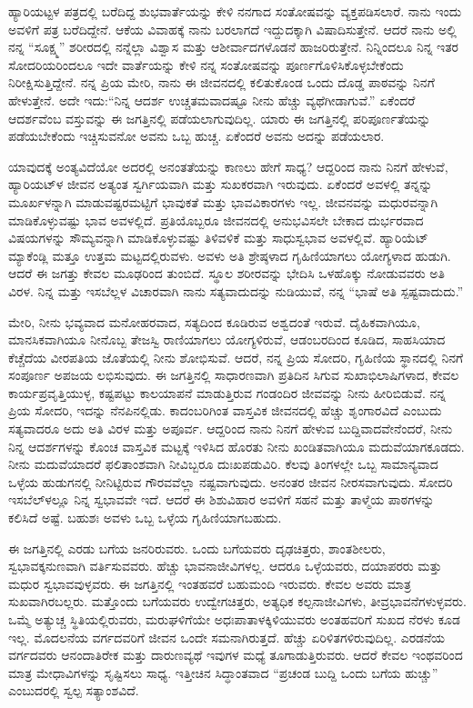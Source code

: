 ಹ್ಯಾರಿಯಟ್ಟಳ ಪತ್ರದಲ್ಲಿ ಬರೆದಿದ್ದ ಶುಭವಾರ್ತೆಯನ್ನು ಕೇಳಿ ನನಗಾದ ಸಂತೋಷವನ್ನು ವ್ಯಕ್ತಪಡಿಸಲಾರೆ. ನಾನು ಇಂದು ಅವಳಿಗೆ ಪತ್ರ ಬರೆದಿದ್ದೇನೆ. ಆಕೆಯ ವಿವಾಹಕ್ಕೆ ನಾನು ಬರಲಾಗದೆ ಇದ್ದುದಕ್ಕಾಗಿ ವಿಷಾದಿಸುತ್ತೇನೆ. ಆದರೆ ನಾನು ಅಲ್ಲಿ ನನ್ನ “ಸೂಕ್ಷ್ಮ” ಶರೀರದಲ್ಲಿ ನನ್ನೆಲ್ಲಾ ವಿಶ್ವಾಸ ಮತ್ತು ಆಶೀರ್ವಾದಗಳೊಡನೆ ಹಾಜರಿರುತ್ತೇನೆ. ನಿನ್ನಿಂದಲೂ ನಿನ್ನ ಇತರ ಸೋದರಿಯರಿಂದಲೂ ಇದೇ ವಾರ್ತೆಯನ್ನು ಕೇಳಿ ನನ್ನ ಸಂತೋಷವನ್ನು ಪೂರ್ಣಗೊಳಿಸಿಕೊಳ್ಳಬೇಕೆಂದು ನಿರೀಕ್ಷಿಸುತ್ತಿದ್ದೇನೆ. ನನ್ನ ಪ್ರಿಯ ಮೇರಿ, ನಾನು ಈ ಜೀವನದಲ್ಲಿ ಕಲಿತುಕೊಂಡ ಒಂದು ದೊಡ್ಡ ಪಾಠವನ್ನು ನಿನಗೆ ಹೇಳುತ್ತೇನೆ. ಅದೇ ಇದು:\break “ನಿನ್ನ ಆದರ್ಶ ಉಚ್ಚತಮವಾದಷ್ಟೂ ನೀನು ಹೆಚ್ಚು ವ್ಯಥೆಗೀಡಾಗುವೆ.” ಏಕೆಂದರೆ ಆದರ್ಶವೆಂಬ ವಸ್ತುವನ್ನು ಈ ಜಗತ್ತಿನಲ್ಲಿ ಪಡೆಯಲಾಗುವುದಿಲ್ಲ. ಯಾರು ಈ ಜಗತ್ತಿನಲ್ಲಿ ಪರಿಪೂರ್ಣತೆಯನ್ನು ಪಡೆಯಬೇಕೆಂದು ಇಚ್ಚಿಸುವನೋ ಅವನು ಒಬ್ಬ ಹುಚ್ಚ. ಏಕೆಂದರೆ ಅವನು ಅದನ್ನು ಪಡೆಯಲಾರ.

ಯಾವುದಕ್ಕೆ ಅಂತ್ಯವಿದೆಯೋ ಅದರಲ್ಲಿ ಅನಂತತೆಯನ್ನು ಕಾಣಲು ಹೇಗೆ ಸಾಧ್ಯ? ಆದ್ದರಿಂದ ನಾನು ನಿನಗೆ ಹೇಳುವೆ, ಹ್ಯಾರಿಯಟ್‌ಳ ಜೀವನ ಅತ್ಯಂತ ಸ್ವರ್ಗಿಯವಾಗಿ ಮತ್ತು ಸುಖಕರವಾಗಿ ಇರುವುದು. ಏಕೆಂದರೆ ಅವಳಲ್ಲಿ ತನ್ನನ್ನು ಮೂರ್ಖಳನ್ನಾಗಿ ಮಾಡುವಷ್ಟರಮಟ್ಟಿಗೆ ಭಾವುಕತೆ ಮತ್ತು ಭಾವವಿಕಾರಗಳು ಇಲ್ಲ. ಜೀವನವನ್ನು ಮಧುರವನ್ನಾಗಿ ಮಾಡಿಕೊಳ್ಳುವಷ್ಟು ಭಾವ ಅವಳಲ್ಲಿದೆ. ಪ್ರತಿಯೊಬ್ಬರೂ ಜೀವನದಲ್ಲಿ ಅನುಭವಿಸಲೇ ಬೇಕಾದ ದುರ್ಭರವಾದ ವಿಷಯಗಳನ್ನು ಸೌಮ್ಯವನ್ನಾಗಿ ಮಾಡಿಕೊಳ್ಳುವಷ್ಟು ತಿಳಿವಳಿಕೆ ಮತ್ತು ಸಾಧುಸ್ವಭಾವ ಅವಳಲ್ಲಿವೆ. ಹ್ಯಾರಿಯೆಟ್ ಮ್ಯಾಕೆಂಡ್ಲಿ ಮತ್ತೂ ಉತ್ತಮ ಮಟ್ಟದಲ್ಲಿರುವಳು. ಅವಳು ಅತಿ ಶ್ರೇಷ್ಠಳಾದ ಗೃಹಿಣಿಯಾಗಲು ಯೋಗ್ಯಳಾದ ಹುಡುಗಿ. ಆದರೆ ಈ ಜಗತ್ತು ಕೇವಲ ಮೂಢರಿಂದ ತುಂಬಿದೆ. ಸ್ಥೂಲ ಶರೀರವನ್ನು ಭೇದಿಸಿ ಒಳಹೊಕ್ಕು ನೋಡುವವರು ಅತಿ ವಿರಳ. ನಿನ್ನ ಮತ್ತು ಇಸಬೆಲ್ಲಳ ವಿಚಾರವಾಗಿ ನಾನು ಸತ್ಯವಾದುದನ್ನು ನುಡಿಯುವೆ, ನನ್ನ “ಭಾಷೆ ಅತಿ ಸ್ಪಷ್ಟವಾದುದು.”

ಮೇರಿ, ನೀನು ಭವ್ಯವಾದ ಮನೋಹರವಾದ, ಸತ್ಯದಿಂದ ಕೂಡಿರುವ ಅಶ್ವದಂತೆ ಇರುವೆ. ದೈಹಿಕವಾಗಿಯೂ, ಮಾನಸಿಕವಾಗಿಯೂ ನೀನೊಬ್ಬ ತೇಜಸ್ವಿ ರಾಣಿಯಾಗಲು ಯೋಗ್ಯಳಿರುವೆ, ಆಡಂಬರದಿಂದ ಕೂಡಿದ, ಸಾಹಸಿಯಾದ ಕೆಚ್ಚೆದೆಯ ವೀರಪತಿಯ ಜೊತೆಯಲ್ಲಿ ನೀನು ಶೋಭಿಸುವೆ. ಆದರೆ, ನನ್ನ ಪ್ರಿಯ ಸೋದರಿ, ಗೃಹಿಣಿಯ ಸ್ಥಾನದಲ್ಲಿ ನಿನಗೆ ಸಂಪೂರ್ಣ ಅಪಜಯ ಲಭಿಸುವುದು. ಈ ಜಗತ್ತಿನಲ್ಲಿ ಸಾಧಾರಣವಾಗಿ ಪ್ರತಿದಿನ ಸಿಗುವ ಸುಖಾಭಿಲಾಷಿಗಳಾದ, ಕೇವಲ ಕಾರ್ಯಪ್ರವೃತ್ತಿಯುಳ್ಳ, ಕಷ್ಟಪಟ್ಟು ಕಾಲಯಾಪನೆ ಮಾಡುತ್ತಿರುವ ಗಂಡಂದಿರ ಜೀವವನ್ನು ನೀನು ಹೀರಿಬಿಡುವೆ. ನನ್ನ ಪ್ರಿಯ ಸೋದರಿ, ಇದನ್ನು ನೆನಪಿನಲ್ಲಿಡು. ಕಾದಂಬರಿಗಿಂತ ವಾಸ್ತವಿಕ ಜೀವನದಲ್ಲಿ ಹೆಚ್ಚು ಶೃಂಗಾರವಿದೆ ಎಂಬುದು ಸತ್ಯವಾದರೂ ಅದು ಅತಿ ವಿರಳ ಮತ್ತು ಅಪೂರ್ವ. ಆದ್ದರಿಂದ ನಾನು ನಿನಗೆ ಹೇಳುವ ಬುದ್ದಿವಾದವೇನೆಂದರೆ, ನೀನು ನಿನ್ನ ಆದರ್ಶಗಳನ್ನು ಕೊಂಚ ವಾಸ್ತವಿಕ ಮಟ್ಟಕ್ಕೆ ಇಳಿಸಿದ ಹೊರತು ನೀನು ಖಂಡಿತವಾಗಿಯೂ ಮದುವೆಯಾಗಕೂಡದು. ನೀನು ಮದುವೆಯಾದರೆ ಫಲಿತಾಂಶವಾಗಿ ನೀವಿಬ್ಬರೂ ದುಃಖಪಡುವಿರಿ. ಕೆಲವು ತಿಂಗಳಲ್ಲೇ ಒಬ್ಬ ಸಾಮಾನ್ಯವಾದ ಒಳ್ಳೆಯ ಹುಡುಗನಲ್ಲಿ ನೀನಿಟ್ಟಿರುವ ಗೌರವವೆಲ್ಲಾ ನಷ್ಟವಾಗುವುದು. ಅನಂತರ ಜೀವನ ನೀರಸವಾಗುವುದು. ಸೋದರಿ ಇಸಬೆಲ್‌ಳಲ್ಲೂ ನಿನ್ನ ಸ್ವಭಾವವೇ ಇದೆ. ಆದರೆ ಈ ಶಿಶುವಿಹಾರ ಅವಳಿಗೆ ಸಹನೆ ಮತ್ತು ತಾಳ್ಮೆಯ ಪಾಠಗಳನ್ನು ಕಲಿಸಿದೆ ಅಷ್ಟೆ. ಬಹುಶಃ ಅವಳು ಒಬ್ಬ ಒಳ್ಳೆಯ ಗೃಹಿಣಿಯಾಗಬಹುದು.

ಈ ಜಗತ್ತಿನಲ್ಲಿ ಎರಡು ಬಗೆಯ ಜನರಿರುವರು. ಒಂದು ಬಗೆಯವರು ದೃಢಚಿತ್ತರು, ಶಾಂತಶೀಲರು, ಸ್ವಭಾವಕ್ಕನುಣವಾಗಿ ವರ್ತಿಸುವವರು. ಹೆಚ್ಚು ಭಾವನಾಜೀವಿಗಳಲ್ಲ. ಆದರೂ ಒಳ್ಳೆಯವರು, ದಯಾಪರರು ಮತ್ತು ಮಧುರ ಸ್ವಭಾವವುಳ್ಳವರು. ಈ ಜಗತ್ತಿನಲ್ಲಿ ಇಂತಹವರೆ ಬಹುಮಂದಿ ಇರುವರು. ಕೇವಲ ಅವರು ಮಾತ್ರ ಸುಖವಾಗಿರಬಲ್ಲರು. ಮತ್ತೊಂದು ಬಗೆಯವರು\enginline{-} ಉದ್ವೇಗಚಿತ್ತರು, ಅತ್ಯಧಿಕ ಕಲ್ಪನಾಜೀವಿಗಳು, ತೀವ್ರಭಾವನೆಗಳುಳ್ಳವರು. ಒಮ್ಮೆ ಅತ್ಯುಚ್ಚ ಸ್ಥಿತಿಯಲ್ಲಿರುವರು, ಮರುಘಳಿಗೆಯೇ ಅಧಃಪಾತಾಳಕ್ಕಿಳಿಯುವರು\enginline{-} ಅಂತಹವರಿಗೆ ಸುಖದ ನೆರಳು ಕೂಡ ಇಲ್ಲ. ಮೊದಲನೆಯ ವರ್ಗದವರಿಗೆ ಜೀವನ ಒಂದೇ ಸಮನಾಗಿರುತ್ತದೆ. ಹೆಚ್ಚು ಏರಿಳಿತಗಳಿರುವುದಿಲ್ಲ. ಎರಡನೆಯ ವರ್ಗದವರು ಆನಂದಾತಿರೇಕ ಮತ್ತು ದಾರುಣವ್ಯಥೆ ಇವುಗಳ ಮಧ್ಯೆ ತೂಗಾಡುತ್ತಿರುವರು. ಆದರೆ ಕೇವಲ ಇಂಥವರಿಂದ ಮಾತ್ರ ಮೇಧಾವಿಗಳನ್ನು ಸೃಷ್ಟಿಸಲು ಸಾಧ್ಯ. ಇತ್ತೀಚಿನ ಸಿದ್ಧಾಂತವಾದ “ಪ್ರಚಂಡ ಬುದ್ದಿ ಒಂದು ಬಗೆಯ ಹುಚ್ಚು” ಎಂಬುದರಲ್ಲಿ ಸ್ವಲ್ಪ ಸತ್ಯಾಂಶವಿದೆ.

